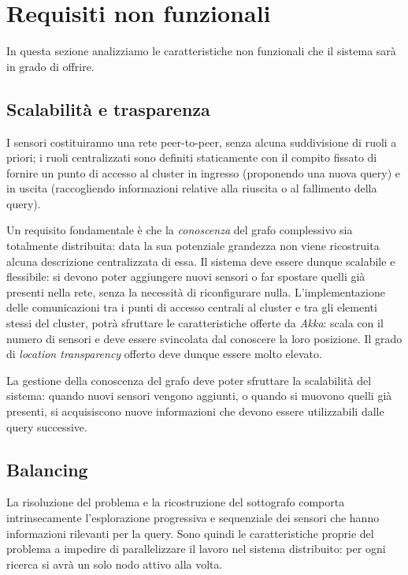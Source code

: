 \documentclass{llncs}
\begin{document}
\section{Requisiti non funzionali}
\label{sec:nonfunc-req}

In questa sezione analizziamo le caratteristiche non funzionali
che il sistema sarà in grado di offrire.

\subsection{Scalabilità e trasparenza}
I sensori costituiranno una rete peer-to-peer,
senza alcuna suddivisione di ruoli a priori; i ruoli centralizzati
sono definiti staticamente con il compito fissato di fornire un punto
di accesso al cluster in ingresso (proponendo una nuova query) e
in uscita (raccogliendo informazioni relative alla riuscita
o al fallimento della query).

Un requisito fondamentale è che
la \emph{conoscenza} del grafo complessivo sia totalmente distribuita:
data la sua potenziale grandezza
non viene ricostruita alcuna descrizione centralizzata di essa.
Il sistema deve essere dunque scalabile e flessibile:
si devono poter aggiungere nuovi sensori o far spostare
quelli già presenti nella rete, senza la necessità di riconfigurare nulla.
L'implementazione delle
comunicazioni tra i punti di accesso centrali al cluster e
tra gli elementi stessi del cluster, potrà
sfruttare le caratteristiche offerte da \emph{Akka}:
scala con il numero di sensori e
deve essere svincolata dal conoscere la loro posizione.
Il grado di \emph{location transparency} offerto deve dunque essere molto elevato.

La gestione della conoscenza del grafo deve poter
sfruttare la scalabilità del sistema: quando nuovi sensori vengono
aggiunti, o quando si muovono quelli già presenti, si acquisiscono
nuove informazioni che devono essere utilizzabili dalle query successive.

\subsection{Balancing}
La risoluzione del problema e la ricostruzione del sottografo
comporta intrinsecamente l'esplorazione progressiva e sequenziale
dei sensori che hanno informazioni rilevanti per la query.
Sono quindi le caratteristiche proprie del problema a impedire di
parallelizzare il lavoro nel sistema distribuito:
per ogni ricerca si avrà un solo nodo attivo alla volta.
\end{document}

